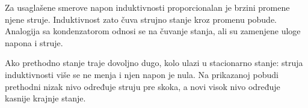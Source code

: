 Za usaglašene smerove napon induktivnosti proporcionalan je brzini promene njene struje. Induktivnost zato čuva strujno stanje kroz promenu pobude. Analogija sa kondenzatorom odnosi se na čuvanje stanja, ali su zamenjene uloge napona i struje.

Ako prethodno stanje traje dovoljno dugo, kolo ulazi u stacionarno stanje: struja induktivnosti više se ne menja i njen napon je nula. Na prikazanoj pobudi prethodni nizak nivo određuje struju pre skoka, a novi visok nivo određuje kasnije krajnje stanje.

